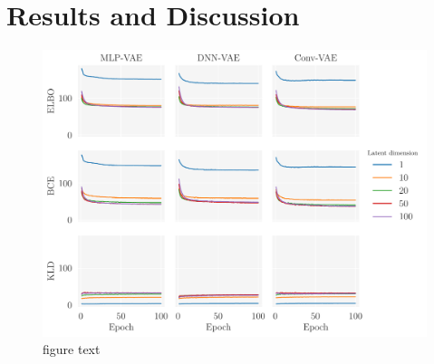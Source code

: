 \newpage
\section{Results and Discussion}\label{sec:Results}

\begin{figure}[!htb]
\begin{center}\includegraphics[scale=0.7]{latex/figures/loss_latent_dim_vanilla_mlp_dnn_vae_bmnist.pdf}
\end{center}
\caption{figure text}
\label{fig:loss_latent_dim_vanilla_mlp_dnn_vae_bmnist}
\end{figure}


